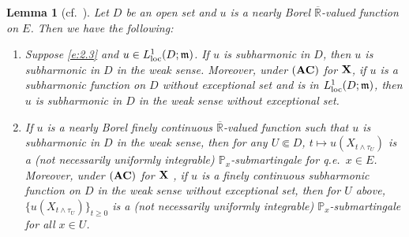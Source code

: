 \documentclass[12pt,a4paper]{article}
\newtheorem{lem}[thm]{Lemma}
\renewcommand{\P}{\mathbb{P}}
\newcommand{\R}{\mathbb{R}}
\newcommand{\m}{\mathfrak{m} }
\newcommand{\loc}{{\rm loc}}
\newcommand{\1}{{\bf 1}}
\begin{document}
\begin{lem}[{cf.~\cite[Lemma~3.9]{CK}}]\label{lem:EquivalenceSubharmonicity}
Let $D$ be an open set and $u$ is a nearly Borel $\overline{\R}$-valued function on $E$. 
Then we have the following:
\begin{enumerate}
\item[\rm(1)]
Suppose \eqref{e:2.3} and $u\in L^1_{\loc}(D;{\m})$. If $u$ is subharmonic in $D$, then $u$ is subharmonic in $D$ in the weak sense. Moreover, under ${\bf (AC)}$ for ${\bf X}$, if $u$ is a subharmonic function on $D$ without  exceptional set and is in $L^1_{\loc}(D;{\m})$, then $u$ is subharmonic in $D$ in the weak sense without exceptional set.
\item[\rm(2)] If $u$ is a nearly Borel finely continuous 
$\overline{\R}$-valued function such that $u$ is subharmonic in $D$ in the weak sense, 
then for any $U\Subset D$, $t\mapsto u(X_{t\land\tau_U})$ is a 
{\rm(}not necessarily uniformly integrable{\rm)} $\mathbb{P}_x$-submartingale for q.e.~$x\in E$. Moreover, under ${\bf (AC)}$ for ${\bf X}$ , if $u$ is a finely continuous subharmonic function on $D$ in the weak sense without exceptional set, then for $U$ above, $\{u(X_{t\land\tau_U})\}_{t\geq0}$ is a {\rm(}not necessarily uniformly integrable{\rm)} $\P_x$-submartingale for all $x\in U$. 
\end{enumerate}
\end{lem}
\end{document}
